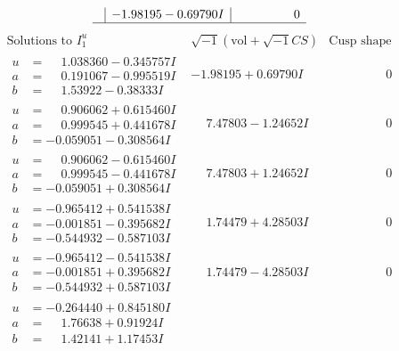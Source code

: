 \documentclass[1p]{elsarticle_modified}
\theoremstyle{definition}
\newcommand{\I}{\sqrt{-1}}
\begin{document}
$$\begin{array}{c|c|c}
 & -1.98195 - 0.69790 I & \phantom{-0.000000 } 0\\
 \hline 
 \end{array}$$\newpage$$\begin{array}{c|c|c}  
\text{Solutions to }I^u_{1}& \I (\text{vol} + \sqrt{-1}CS) & \text{Cusp shape}\\
 \hline 
\begin{aligned}
u &= \phantom{-}1.038360 - 0.345757 I \\
a &= \phantom{-}0.191067 - 0.995519 I \\
b &= \phantom{-}1.53922 - 0.38333 I\end{aligned}
 & -1.98195 + 0.69790 I & \phantom{-0.000000 } 0 \\ \hline\begin{aligned}
u &= \phantom{-}0.906062 + 0.615460 I \\
a &= \phantom{-}0.999545 + 0.441678 I \\
b &= -0.059051 - 0.308564 I\end{aligned}
 & \phantom{-}7.47803 - 1.24652 I & \phantom{-0.000000 } 0 \\ \hline\begin{aligned}
u &= \phantom{-}0.906062 - 0.615460 I \\
a &= \phantom{-}0.999545 - 0.441678 I \\
b &= -0.059051 + 0.308564 I\end{aligned}
 & \phantom{-}7.47803 + 1.24652 I & \phantom{-0.000000 } 0 \\ \hline\begin{aligned}
u &= -0.965412 + 0.541538 I \\
a &= -0.001851 - 0.395682 I \\
b &= -0.544932 - 0.587103 I\end{aligned}
 & \phantom{-}1.74479 + 4.28503 I & \phantom{-0.000000 } 0 \\ \hline\begin{aligned}
u &= -0.965412 - 0.541538 I \\
a &= -0.001851 + 0.395682 I \\
b &= -0.544932 + 0.587103 I\end{aligned}
 & \phantom{-}1.74479 - 4.28503 I & \phantom{-0.000000 } 0 \\ \hline\begin{aligned}
u &= -0.264440 + 0.845180 I \\
a &= \phantom{-}1.76638 + 0.91924 I \\
b &= \phantom{-}1.42141 + 1.17453 I\end{aligned}

\end{array}$$
\end{document}
